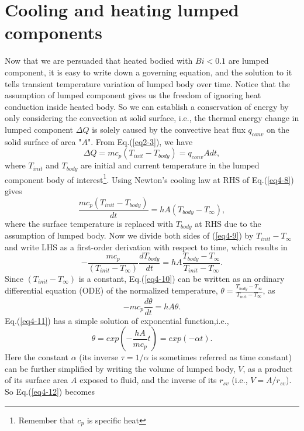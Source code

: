 \section{Cooling and heating lumped components}
Now that we are persuaded that heated bodied with $Bi<0.1$ are lumped component, it is easy to write down a governing equation, and the solution to it tells transient temperature variation of lumped body over time. Notice that the assumption of lumped component gives us the freedom of ignoring heat conduction inside heated body. So we can establish a conservation of energy by only considering the convection at solid surface, i.e., the thermal energy change in lumped component $\Delta Q$ is solely caused by the convective heat flux $q_{conv}$ on the solid surface of area "$A$". From Eq.(\ref{eq2-3}), we have
\begin{equation}
    \Delta Q=mc_p(T_{init}-T_{body})=q_{conv}Adt,
    \label{eq4-8}
\end{equation}
where $T_{init}$ and $T_{body}$ are initial and current temperature in the lumped component body of interest\footnote{Remember that $c_p$ is specific heat}. Using Newton's cooling law at RHS of Eq.(\ref{eq4-8}) gives
\begin{equation}
    \frac{mc_p(T_{init}-T_{body})}{dt}=hA(T_{body}-T_{\infty})
    \label{eq4-9},
\end{equation}
where the surface temperature is replaced with $T_{body}$ at RHS due to the assumption of lumped body. Now we divide both sides of (\ref{eq4-9}) by $T_{init}-T_{\infty}$ and write LHS as a first-order derivation with respect to time, which results in
\begin{equation}
    -\frac{mc_p}{(T_{init}-T_{\infty})}\frac{dT_{body}}{dt}=hA\frac{T_{body}-T_{\infty}}{T_{init}-T_{\infty}}
    \label{eq4-10}.
\end{equation}
Since $(T_{init}-T_{\infty})$ is a constant, Eq.(\ref{eq4-10}) can be written as an ordinary differential equation (ODE) of the normalized temperature, $\theta=\frac{T_{body}-T_{\infty}}{T_{init}-T_{\infty}}$, as
\begin{equation}
    -mc_p\frac{d\theta}{dt}=hA\theta
    \label{eq4-11}.
\end{equation}
Eq.(\ref{eq4-11}) has a simple solution of exponential function,i.e.,
\begin{equation}
    \theta=exp\left(-\frac{hA}{mc_p}t\right)=exp(-\alpha t).
    \label{eq4-12}
\end{equation}
Here the constant $\alpha$ (its inverse $\tau=1/\alpha$ is sometimes referred as time constant) can be further simplified by writing the volume of lumped body, $V$, as a product of its surface area $A$ exposed to fluid, and the inverse of its  $r_{sv}$ (i.e., $V=A/r_{sv}$). So Eq.(\ref{eq4-12}) becomes
